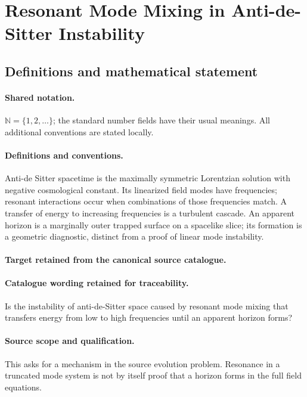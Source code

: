 \documentclass[11pt]{article}
\begin{document}
\section{Resonant Mode Mixing in Anti-de-Sitter Instability}\label{statement}

\subsection{Definitions and mathematical statement}

\paragraph{Shared notation.}$\mathbb N=\{1,2,\ldots\}$; the standard number fields have their usual meanings. All additional conventions are stated locally.


\paragraph{Definitions and conventions.}
Anti-de Sitter spacetime is the maximally symmetric Lorentzian solution with negative cosmological constant. Its linearized field modes have frequencies; resonant interactions occur when combinations of those frequencies match. A transfer of energy to increasing frequencies is a turbulent cascade. An apparent horizon is a marginally outer trapped surface on a spacelike slice; its formation is a geometric diagnostic, distinct from a proof of linear mode instability.

\paragraph{Target retained from the canonical source catalogue.}
\paragraph{Catalogue wording retained for traceability.}
Is the instability of anti-de-Sitter space caused by resonant mode mixing that transfers energy from low to high frequencies until an apparent horizon forms?

\paragraph{Source scope and qualification.}
This asks for a mechanism in the source evolution problem. Resonance in a truncated mode system is not by itself proof that a horizon forms in the full field equations.
\end{document}
